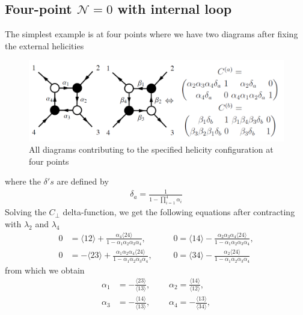 \documentclass[letter,11pt]{article}
\begin{document}
\subsection{Four-point $\mathcal{N}=0$ with internal loop}
The simplest example is at four points where we have two diagrams after fixing the external helicities
\begin{figure}[H]
	\centering
	\includegraphics[width=0.7\linewidth]{YM4pt}
	\caption{All diagrams contributing to the specified helicity configuration at four points}
	\label{fig:jexample}
\end{figure}
where the $\delta's$ are defined by
\begin{equation}
	\begin{aligned}
		\delta_a=\frac{1}{1-\prod_{i=1}^{4}\alpha_i}
	\end{aligned}
\end{equation}
Solving the $C_\perp$ delta-function, we get the following equations after contracting with $\lambda_2$ and $\lambda_4$
\begin{equation}
	\begin{aligned} \label{eq:1}
		           0&=   
		\langle 1 2 \rangle + \frac{ \alpha_{4} \langle 2 4\rangle
		}{1 - \alpha_{1} \alpha_{2} \alpha_{3} \alpha_{4}},~~~~&&
 0=   
\langle 1 4\rangle - \frac{\alpha_{2} \alpha_{3} \alpha_{4} \langle 2 4\rangle
}{1 - \alpha_{1} \alpha_{2} \alpha_{3} \alpha_{4}},
\\
 0&=   
-\langle 23\rangle + \frac{\alpha_{1} \alpha_{2} \alpha_{4} \langle 2 4\rangle
}{1 - \alpha_{1} \alpha_{2} \alpha_{3} \alpha_{4}}
,~~~~&&
	 0=   
	\langle 3 4\rangle - \frac{\alpha_{2}  \langle 2 4\rangle
	}{1 - \alpha_{1} \alpha_{2} \alpha_{3} \alpha_{4}}
	\end{aligned}
\end{equation}
from which we obtain
\begin{equation}
	\begin{aligned} \label{eq:1}
	\alpha_1&=-\frac{\langle 23 \rangle}{\langle 13\rangle},~~~~~~~~~~\alpha_2=\frac{\langle 14 \rangle}{\langle 12\rangle},\\
	\alpha_3&=-\frac{\langle 14 \rangle}{\langle 13\rangle},~~~~~~~~~~	\alpha_4=-\frac{\langle 13 \rangle}{\langle 34\rangle},
	\end{aligned}
\end{equation}
\end{document}
